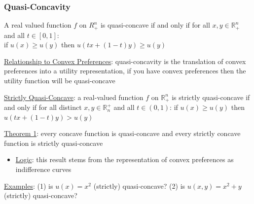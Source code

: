 \documentclass{article}
\begin{document}
\subsubsection{Quasi-Concavity}
A real valued function $f$ on $R_{+}^{n}$ is quasi-concave if and only if for all $x, y \in \mathbb{R}_{+}^{n}$ and all $t \in [0,1]$: \\ if $u(x) \geq u(y)$ then $u(tx + (1-t)y) \geq u(y)$ \par \vspace{0.3em}
  \underline{Relationship to Convex Preferences}: quasi-concavity is the translation of convex preferences into a utility representation, if you have convex preferences then the utility function will be quasi-concave \par
  \underline{Strictly Quasi-Concave}: a real-valued function $f$ on $\mathbb{R}_{+}^{n}$ is strictly quasi-concave if and only if for all distinct $x, y \in \mathbb{R}^{+}_{n}$ and all $t \in (0,1)$: if $u(x) \geq u(y)$ then $u(tx + (1-t)y) > u(y)$
  \par
  \underline{Theorem 1}: every concave function is quasi-concave and every strictly concave function is strictly quasi-concave
  \begin{itemize}
    \item  \underline{Logic}: this result stems from the representation of convex preferences as indifference curves
  \end{itemize}
  \par
  \underline{Examples}: (1) is $u(x) = x^{2}$ (strictly) quasi-concave? (2) is $u(x,y) = x^{2} + y$ (strictly) quasi-concave?
\end{document}
